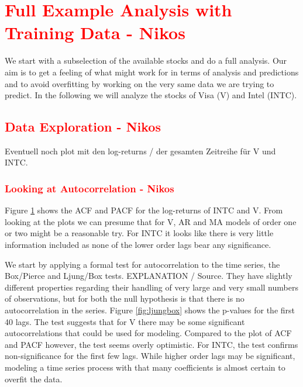 \section{\textcolor{red}{Full Example Analysis with Training Data  - Nikos}}
We start with a subselection of the available stocks and do a full analysis. Our aim is to get a feeling of what might work for in terms of analysis and predictions and to avoid overfitting by working on the very same data we are trying to predict. In the following we will analyze the stocks of Visa (V) and Intel (INTC). 

\subsection{\textcolor{red}{Data Exploration - Nikos}}
Eventuell noch plot mit den log-returns / der gesamten Zeitreihe für V und INTC. 

\subsubsection{\textcolor{red}{Looking at Autocorrelation - Nikos}}
Figure \ref{fig:INTC_V_ACF_log_returns} shows the ACF and PACF for the log-returns of INTC and V. From looking at the plots we can presume that for V, AR and MA models of order one or two might be a reasonable try. For INTC it looks like there is very little information included as none of the lower order lags bear any significance. 

We start by applying a formal test for autocorrelation to the time series, the Box/Pierce and Ljung/Box tests. EXPLANATION / Source. They have slightly different properties regarding their handling of very large and very small numbers of observations, but for both the null hypothesis is that there is no autocorrelation in the series. Figure \ref{fig:ljungbox} shows the p-values for the first 40 lags. The test suggests that for V there may be some significant autocorrelations that could be used for modeling. Compared to the plot of ACF and PACF however, the test seems overly optimistic. For INTC, the test confirms non-significance for the first few lags. While higher order lags may be significant, modeling a time series process with that many coefficients is almost certain to overfit the data. 

\begin{figure}[h]
    \centering
    \begin{adjustbox}{width=.95\textwidth,center}
    
    \end{adjustbox}
    
    \begin{adjustbox}{width=.95\textwidth,center}
    
    \end{adjustbox} 
    
    \caption{}
    \label{fig:INTC_V_ACF_log_returns}
\end{figure}{}

